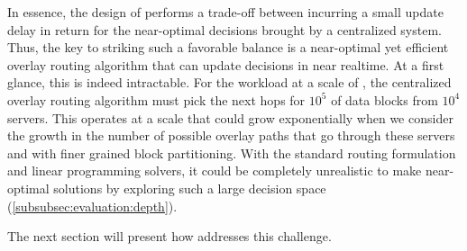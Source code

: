 In essence, the design of \name performs a trade-off between incurring
a small update delay in return for the near-optimal
decisions brought by a centralized system. Thus, the key to striking such a
favorable balance is a near-optimal yet efficient overlay routing
algorithm that can update decisions in near realtime. At a first
glance, this is indeed intractable. For the workload at a scale of
\company, the centralized overlay routing algorithm must pick the next
hops for $10^5$ of data blocks from $10^4$ servers. This operates at a scale that
could grow exponentially when we consider the growth in the number of possible
overlay paths that go through these servers and with  finer grained
block partitioning. With the standard routing formulation and linear
programming solvers, it could be completely unrealistic to make
near-optimal solutions by exploring such a large decision space
(\Section\ref{subsubsec:evaluation:depth}).


The next section will present how \name addresses this challenge.

